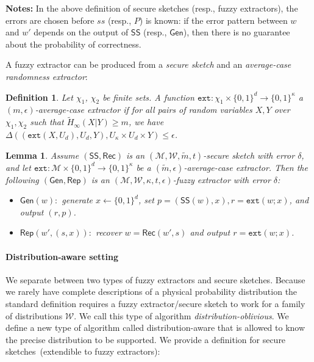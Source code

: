 \documentclass[11pt]{article}
\newcommand{\class}[1]{{\ensuremath{\mathsf{#1}}}}
\newcommand{\gen}{\ensuremath{\class{Gen}}\xspace}
\newcommand{\rep}{\ensuremath{\class{Rep}}\xspace}
\newcommand{\sketch}{\ensuremath{\class{SS}}\xspace}
\newcommand{\rec}{\ensuremath{\class{Rec}}\xspace}
\newcommand{\zo}{\ensuremath{\{0, 1\}}}
\newcommand{\ext}{\ensuremath{\mathtt{ext}}}
\newtheorem{lemma}[theorem]{Lemma}
\newtheorem{definition}[theorem]{Definition}
\begin{document}
\noindent \textbf{Notes:} In the above definition of secure sketches (resp., fuzzy extractors), the errors are chosen before $ss$ (resp., $P$) is known: if the error pattern between $w$ and $w'$ depends on the output of $\sketch$ (resp., $\gen$), then there is no guarantee about the probability of correctness.  

A fuzzy extractor can be produced from a \emph{secure sketch} and an \emph{average-case randomness extractor}:

\begin{definition}
Let $\chi_1$, $\chi_2$ be finite sets.
A function $\ext: \chi_1\times \{0,1\}^d \rightarrow \{0,1\}^\kappa$ a \emph{$(m, \epsilon)$-average-case extractor} if for all pairs
of random variables $X, Y$ over $\chi_1, \chi_2$ such that
$\tilde{H}_\infty(X|Y) \ge m$, we have $\Delta((\ext(X, U_d), U_d, Y), U_\kappa\times
U_d \times Y) \le \epsilon$.
\end{definition}

\begin{lemma}
\label{lem:fuzzy ext construction}
Assume $(\sketch, \rec)$ is an $(\mathcal{M}, \mathcal{W}, \tilde{m}, t)$-secure sketch with error $\delta$, and let $\ext:\mathcal{M}\times \zo^d \rightarrow \zo^\kappa$ be a $(\tilde{m}, \epsilon)$-average-case extractor.  Then the following $(\gen, \rep)$ is an $(\mathcal{M}, \mathcal{W}, \kappa, t, \epsilon)$-fuzzy extractor with error $\delta$:
\begin{itemize}
\item $\gen(w):$ generate $x\leftarrow \zo^d$, set $p=(\sketch(w), x), r=\ext(w;x)$, and output $(r,p)$.
\item $\rep(w', (s, x)):$ recover $w=\rec(w',s)$ and output $r=\ext(w;x)$.
\end{itemize}
\end{lemma}

\paragraph{Distribution-aware setting}
We separate between two types of fuzzy extractors and secure sketches.  Because we rarely have complete descriptions of a physical probability distribution the standard definition requires a fuzzy extractor/secure sketch to work for a family of distributions $\mathcal{W}$.  We call this type of algorithm \emph{distribution-oblivious}.  We define a new type of algorithm called distribution-aware that is allowed to know the precise distribution to be supported.  We provide a definition for secure sketches~(extendible to fuzzy extractors):
\end{document}
